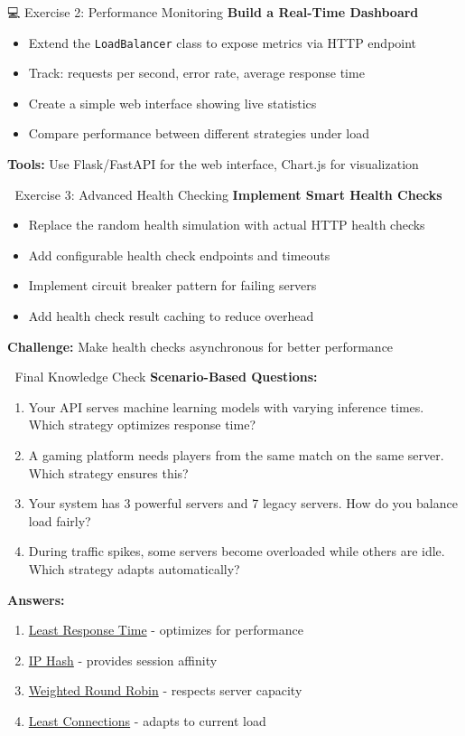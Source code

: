 \documentclass[12pt,a4paper]{article}
\begin{document}
\begin{exercisebox}{💻 Exercise 2: Performance Monitoring}
\textbf{Build a Real-Time Dashboard}
\begin{itemize}
    \item Extend the \texttt{LoadBalancer} class to expose metrics via HTTP endpoint
    \item Track: requests per second, error rate, average response time
    \item Create a simple web interface showing live statistics
    \item Compare performance between different strategies under load
\end{itemize}
\textbf{Tools:} Use Flask/FastAPI for the web interface, Chart.js for visualization
\end{exercisebox}

\begin{exercisebox}{🔧 Exercise 3: Advanced Health Checking}
\textbf{Implement Smart Health Checks}
\begin{itemize}
    \item Replace the random health simulation with actual HTTP health checks
    \item Add configurable health check endpoints and timeouts
    \item Implement circuit breaker pattern for failing servers
    \item Add health check result caching to reduce overhead
\end{itemize}
\textbf{Challenge:} Make health checks asynchronous for better performance
\end{exercisebox}

\begin{quizbox}{🧠 Final Knowledge Check}
\textbf{Scenario-Based Questions:}
\begin{enumerate}
    \item Your API serves machine learning models with varying inference times. Which strategy optimizes response time?
    \item A gaming platform needs players from the same match on the same server. Which strategy ensures this?
    \item Your system has 3 powerful servers and 7 legacy servers. How do you balance load fairly?
    \item During traffic spikes, some servers become overloaded while others are idle. Which strategy adapts automatically?
\end{enumerate}
\textbf{Answers:}
\begin{enumerate}
    \item \hyperref[subsec:leastresponse]{Least Response Time} - optimizes for performance
    \item \hyperref[subsec:iphash]{IP Hash} - provides session affinity  
    \item \hyperref[subsec:weighted]{Weighted Round Robin} - respects server capacity
    \item \hyperref[subsec:leastconn]{Least Connections} - adapts to current load
\end{enumerate}
\end{quizbox}
\end{document}
